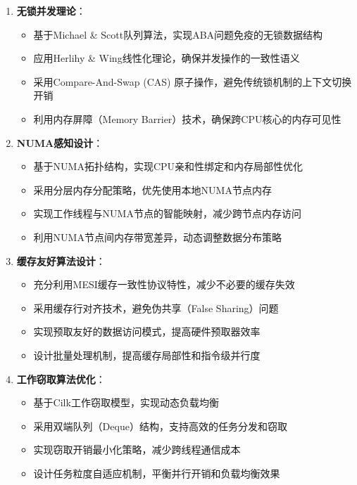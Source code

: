 \begin{enumerate}
    \item \textbf{无锁并发理论}：
    \begin{itemize}
        \item 基于Michael \& Scott队列算法，实现ABA问题免疫的无锁数据结构
        \item 应用Herlihy \& Wing线性化理论，确保并发操作的一致性语义
        \item 采用Compare-And-Swap (CAS) 原子操作，避免传统锁机制的上下文切换开销
        \item 利用内存屏障（Memory Barrier）技术，确保跨CPU核心的内存可见性
    \end{itemize}
    
    \item \textbf{NUMA感知设计}：
    \begin{itemize}
        \item 基于NUMA拓扑结构，实现CPU亲和性绑定和内存局部性优化
        \item 采用分层内存分配策略，优先使用本地NUMA节点内存
        \item 实现工作线程与NUMA节点的智能映射，减少跨节点内存访问
        \item 利用NUMA节点间内存带宽差异，动态调整数据分布策略
    \end{itemize}
    
    \item \textbf{缓存友好算法设计}：
    \begin{itemize}
        \item 充分利用MESI缓存一致性协议特性，减少不必要的缓存失效
        \item 采用缓存行对齐技术，避免伪共享（False Sharing）问题
        \item 实现预取友好的数据访问模式，提高硬件预取器效率
        \item 设计批量处理机制，提高缓存局部性和指令级并行度
    \end{itemize}
    
    \item \textbf{工作窃取算法优化}：
    \begin{itemize}
        \item 基于Cilk工作窃取模型，实现动态负载均衡
        \item 采用双端队列（Deque）结构，支持高效的任务分发和窃取
        \item 实现窃取开销最小化策略，减少跨线程通信成本
        \item 设计任务粒度自适应机制，平衡并行开销和负载均衡效果
    \end{itemize}
    

\end{enumerate}
